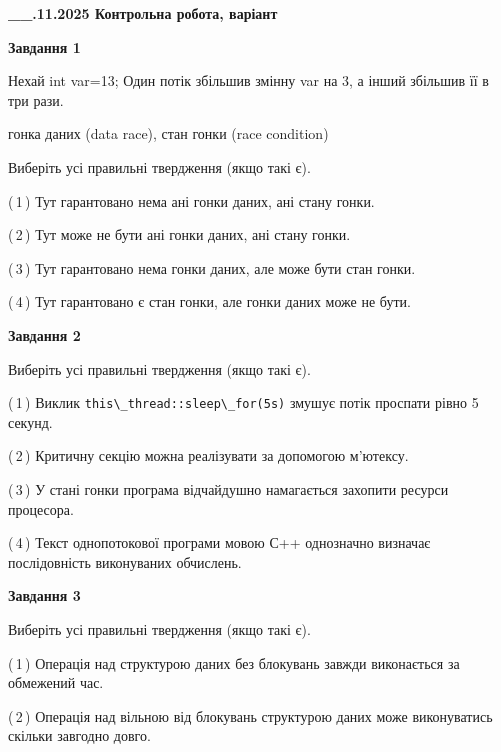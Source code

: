 \documentclass[12pt, ukrainian]{article}
\def\code#1{\Verb!#1!}
\begin{document}
\begin {large}

\textbf{\_\_.11.2025 Контрольна робота, варіант  }\par


{

\begin{center}
\textbf{Завдання 1}
\end{center}
Нехай int var=13; Один потік збільшив змінну var на 3, а інший збільшив її в три рази.

гонка даних (data race), стан гонки (race condition)

Виберіть усі правильні твердження (якщо такі є).\par
\vspace{2mm}
(\,1\,) Тут гарантовано нема ані гонки даних, ані стану гонки.%

(\,2\,) Тут може не бути ані гонки даних, ані стану гонки.%

(\,3\,) Тут гарантовано нема гонки даних, але може бути стан гонки.%

(\,4\,) Тут гарантовано є стан гонки, але гонки даних може не бути.%



\begin{center}
\textbf{Завдання 2}
\end{center}
Виберіть усі правильні твердження (якщо такі є).\par
\vspace{2mm}

(\,1\,) Виклик \code{this\_thread::sleep\_for(5s)} змушує потік проспати рівно 5 секунд.%

(\,2\,) Критичну секцію можна реалізувати за допомогою м’ютексу.%

(\,3\,) У стані гонки програма відчайдушно намагається захопити ресурси процесора.%

(\,4\,) Текст однопотокової програми мовою С++ однозначно визначає послідовність виконуваних обчислень.%



\begin{center}
\textbf{Завдання 3}
\end{center}
Виберіть усі правильні твердження (якщо такі є).\par
\vspace{2mm}

(\,1\,) Операція над структурою даних без блокувань завжди виконається за обмежений час.%

(\,2\,) Операція над вільною від блокувань структурою даних може виконуватись скільки завгодно довго.%

}
\end{large}
\end{document}
